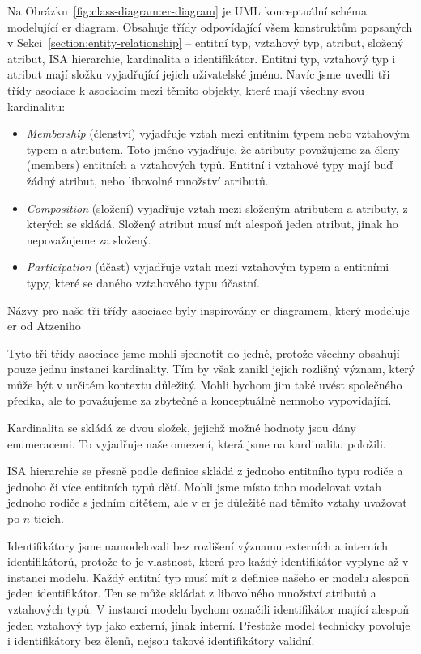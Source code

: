 Na Obrázku~\ref{fig:class-diagram:er-diagram} je \acrshort{UML} konceptuální schéma modelující \acrshort{er} diagram.
Obsahuje třídy odpovídající všem konstruktům popsaných v Sekci~\ref{section:entity-relationship} -- entitní typ, vztahový typ, atribut, složený atribut, ISA hierarchie, kardinalita a identifikátor.
Entitní typ, vztahový typ i atribut mají složku vyjadřující jejich uživatelské jméno.
Navíc jsme uvedli tři třídy asociace k asociacím mezi těmito objekty, které mají všechny svou kardinalitu:
\begin{itemize}
  \item \emph{Membership} (členství) vyjadřuje vztah mezi entitním typem nebo vztahovým typem a atributem.
        Toto jméno vyjadřuje, že atributy považujeme za členy (members) entitních a vztahových typů.
        Entitní i vztahové typy mají buď žádný atribut, nebo libovolné množství atributů.
  \item \emph{Composition} (složení) vyjadřuje vztah mezi složeným atributem a atributy, z kterých se skládá.
        Složený atribut musí mít alespoň jeden atribut, jinak ho nepovažujeme za složený.
  \item \emph{Participation} (účast) vyjadřuje vztah mezi vztahovým typem a entitními typy, které se daného vztahového typu účastní.
\end{itemize}

Názvy pro naše tři třídy asociace byly inspirovány \acrshort{er} diagramem, který modeluje \acrshort{er} od Atzeniho~\cite[Obr.~5.22]{atzeni_database_1999}

Tyto tři třídy asociace jsme mohli sjednotit do jedné, protože všechny obsahují pouze jednu instanci kardinality.
Tím by však zanikl jejich rozlišný význam, který může být v určitém kontextu důležitý.
Mohli bychom jim také uvést společného předka, ale to považujeme za zbytečné a konceptuálně nemnoho vypovídající.

Kardinalita se skládá ze dvou složek, jejichž možné hodnoty jsou dány enumeracemi.
To vyjadřuje naše omezení, která jsme na kardinalitu položili.

ISA hierarchie se přesně podle definice skládá z jednoho entitního typu rodiče a jednoho či více entitních typů dětí.
Mohli jsme místo toho modelovat vztah jednoho rodiče s jedním dítětem, ale v \acrshort{er} je důležité nad těmito vztahy uvažovat po $n$-ticích.

Identifikátory jsme namodelovali bez rozlišení významu externích a interních identifikátorů, protože to je vlastnost, která pro každý identifikátor vyplyne až v instanci modelu.
Každý entitní typ musí mít z definice našeho \acrshort{er} modelu alespoň jeden identifikátor.
Ten se může skládat z libovolného množství atributů a vztahových typů.
V instanci modelu bychom označili identifikátor mající alespoň jeden vztahový typ jako externí, jinak interní.
Přestože model technicky povoluje i identifikátory bez členů, nejsou takové identifikátory validní.

